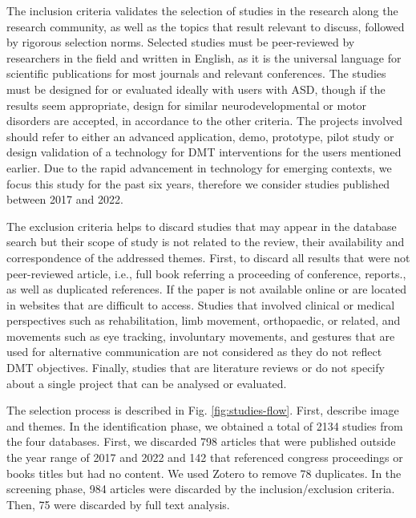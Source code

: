 \documentclass[a4paper,fleqn]{cas-sc}
\begin{document}
The inclusion criteria validates the selection of studies in the research along the research community, as well as the topics that result relevant to discuss, followed by rigorous selection norms. Selected studies must be peer-reviewed by researchers in the field and written in English, as it is the universal language for scientific publications for most journals and relevant conferences. The studies must be designed for or evaluated ideally with users with ASD, though if the results seem appropriate, design for similar neurodevelopmental or motor disorders are accepted, in accordance to the other criteria. The projects involved should refer to either an advanced application, demo, prototype, pilot study or design validation of a technology for DMT interventions for the users mentioned earlier. Due to the rapid advancement in technology for emerging contexts, we focus this study for the past six years, therefore we consider studies published between 2017 and 2022.


The exclusion criteria helps to discard studies that may appear in the database search but their scope of study is not related to the review, their availability and correspondence of the addressed themes. First, to discard all results that were not peer-reviewed article, i.e., full book referring a proceeding of conference, reports., as well as duplicated references. If the paper is not available online or are located in websites that are difficult to access. Studies that involved clinical or medical perspectives such as rehabilitation, limb movement, orthopaedic, or related, and movements such as eye tracking, involuntary movements, and gestures that are used for alternative communication are not considered as they do not reflect DMT objectives. Finally, studies that are literature reviews or do not specify about a single project that can be analysed or evaluated.


The selection process is described in Fig. \ref{fig:studies-flow}. First, describe image and themes.
In the identification phase, we obtained a total of 2134 studies from the four databases. First, we discarded 798 articles that were published outside the year range of 2017 and 2022 and 142 that referenced congress proceedings or books titles but had no content. We used Zotero to remove 78 duplicates. In the screening phase, 984 articles were discarded by the inclusion/exclusion criteria. Then, 75 were discarded by full text analysis. 
\end{document}
